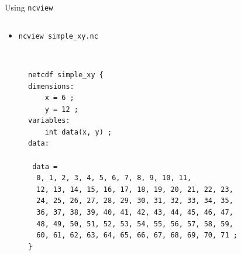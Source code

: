 \documentclass[compress,11pt,xcolor=svgnames,aspectratio=169]{beamer}
\begin{document}
\begin{frame}[fragile]{Using \texttt{ncview}}

\begin{columns}

\begin{column}{0.4\textwidth}

\begin{itemize}
  \item \verb|ncview simple_xy.nc|
\end{itemize}

\end{column}

\begin{column}{0.6\textwidth}
\begin{center}
\end{center}
\end{column}

\end{columns}

\begin{figure}
\centering
\begin{varwidth}{\linewidth}

{\tiny

\begin{verbatim}

netcdf simple_xy {
dimensions:
	x = 6 ;
	y = 12 ;
variables:
	int data(x, y) ;
data:

 data =
  0, 1, 2, 3, 4, 5, 6, 7, 8, 9, 10, 11,
  12, 13, 14, 15, 16, 17, 18, 19, 20, 21, 22, 23,
  24, 25, 26, 27, 28, 29, 30, 31, 32, 33, 34, 35,
  36, 37, 38, 39, 40, 41, 42, 43, 44, 45, 46, 47,
  48, 49, 50, 51, 52, 53, 54, 55, 56, 57, 58, 59,
  60, 61, 62, 63, 64, 65, 66, 67, 68, 69, 70, 71 ;
}

\end{verbatim}

}

\end{varwidth}
\end{figure}

\end{frame}
\end{document}
